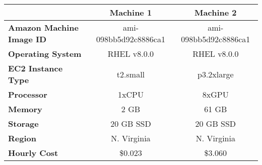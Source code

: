 \documentclass[10pt,journal,compsoc]{IEEEtran}
\begin{document}
\begin{table}
\renewcommand{\arraystretch}{1.5}
\centering
\begin{tabular}{|l|c|c|}
\hline
\rowcolor{gray} & \textbf{Machine 1} & \textbf{Machine 2} \\
\hline
\textbf{Amazon Machine Image ID} & ami-098bb5d92c8886ca1 & ami-098bb5d92c8886ca1 \\
\hline
\textbf{Operating System} & RHEL v8.0.0 & RHEL v8.0.0 \\
\hline
\textbf{EC2 Instance Type} & t2.small & p3.2xlarge \\
\hline
\textbf{Processor} & 1xCPU & 8xGPU \\
\hline
\textbf{Memory} & 2 GB & 61 GB \\
\hline
\textbf{Storage} & 20 GB SSD & 20 GB SSD \\
\hline
\textbf{Region} & N. Virginia & N. Virginia \\
\hline
\textbf{Hourly Cost} & \$0.023 & \$3.060 \\
\hline
\end{tabular}
\end{table}
\end{document}
